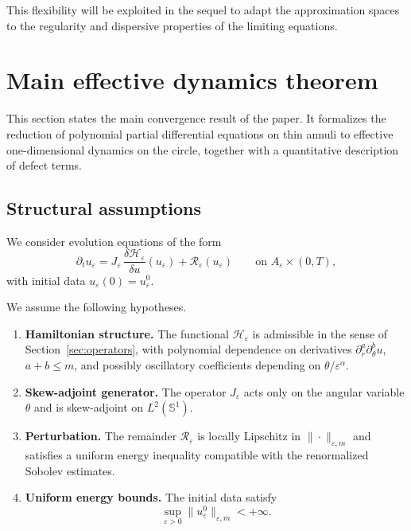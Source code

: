 \documentclass[11pt]{amsart}
\theoremstyle{plain}
\theoremstyle{definition}
\theoremstyle{remark}
\theoremstyle{remark}
\begin{document}
This flexibility will be exploited in the sequel to adapt the approximation
spaces to the regularity and dispersive properties of the limiting equations.


\section{Main effective dynamics theorem}
\label{sec:main-theorem}

This section states the main convergence result of the paper.
It formalizes the reduction of polynomial partial differential equations on thin
annuli to effective one-dimensional dynamics on the circle, together with a
quantitative description of defect terms.

\subsection{Structural assumptions}

We consider evolution equations of the form
\begin{equation}
\label{eq:main-evolution}
\partial_t u_\varepsilon
=
J_\varepsilon\,\frac{\delta\mathcal H_\varepsilon}{\delta u}(u_\varepsilon)
+
\mathcal R_\varepsilon(u_\varepsilon)
\qquad\text{on } A_\varepsilon\times(0,T),
\end{equation}
with initial data $u_\varepsilon(0)=u_\varepsilon^0$.

We assume the following hypotheses.

\begin{enumerate}
\item[(H1)] \textbf{Hamiltonian structure.}
The functional $\mathcal H_\varepsilon$ is admissible in the sense of
Section~\ref{sec:operators}, with polynomial dependence on derivatives
$\partial_r^a\partial_\theta^b u$, $a+b\le m$, and possibly oscillatory
coefficients depending on $\theta/\varepsilon^\alpha$.

\item[(H2)] \textbf{Skew-adjoint generator.}
The operator $J_\varepsilon$ acts only on the angular variable $\theta$ and is
skew-adjoint on $L^2(\mathbb S^1)$.

\item[(H3)] \textbf{Perturbation.}
The remainder $\mathcal R_\varepsilon$ is locally Lipschitz in
$\|\cdot\|_{\varepsilon,m}$ and satisfies a uniform energy inequality compatible
with the renormalized Sobolev estimates.

\item[(H4)] \textbf{Uniform energy bounds.}
The initial data satisfy
\[
\sup_{\varepsilon>0}
\|u_\varepsilon^0\|_{\varepsilon,m}
<+\infty.
\]
\end{enumerate}
\end{document}
